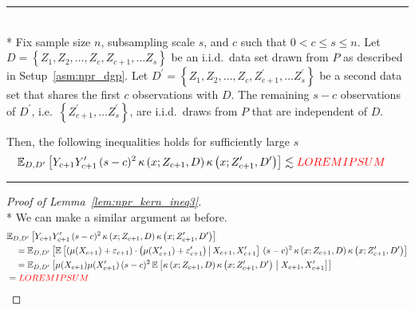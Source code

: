 \hrule

\begin{lem}\label{lem:npr_kern_ineq3}\mbox{}\\*
	Fix sample size $n$, subsampling scale $s$, and $c$ such that $0 < c \leq s \leq n$.
	Let $D = \left\{Z_1, Z_2, \dotsc, Z_c, Z_{c+1}, \dotsc Z_s \right\}$ be an i.i.d.\ data set drawn from $P$ as described in Setup~\ref{asm:npr_dgp}.
	Let $D^{\prime} = \left\{Z_1, Z_2, \dotsc, Z_c, Z_{c+1}^{\prime}, \dotsc Z_s^{\prime} \right\}$ be a second data set that shares the first $c$ observations with $D$.
	The remaining $s - c$ observations of $D^{\prime}$, i.e.\ $\left\{Z_{c+1}^{\prime}, \dotsc Z_s^{\prime} \right\}$, are i.i.d.\ draws from $P$ that are independent of $D$.

	Then, the following inequalities holds for sufficiently large $s$
	\begin{equation}
		\begin{aligned}
			\mathbb{E}_{D, D^{\prime}}\left[Y_{c+1}Y_{c+1}^{\prime} \, (s-c)^2 \, \kappa\left(x; Z_{c+1}, D\right)\kappa\left(x; Z_{c+1}^{\prime}, D^{\prime}\right)\right]
		 & \lesssim  {\color{red} LOREM IPSUM}	
		\end{aligned}
	\end{equation}
\end{lem}

\hrule

\begin{proof}[Proof of Lemma~\ref{lem:npr_kern_ineq3}]\mbox{}\\*
	We can make a similar argument as before.
	\begin{equation}
		\begin{aligned}
			& \mathbb{E}_{D, D^{\prime}}\left[Y_{c+1}Y_{c+1}^{\prime} \, (s-c)^2 \, \kappa\left(x; Z_{c+1}, D\right)\kappa\left(x; Z_{c+1}^{\prime}, D^{\prime}\right)\right]\\
			& \quad = \mathbb{E}_{D, D^{\prime}}\left[\mathbb{E}\left[\left(\mu(X_{c+1}) + \varepsilon_{c+1}\right) \cdot \left(\mu(X_{c+1}^{\prime}) + \varepsilon_{c+1}^{\prime}\right) \, \middle| \, X_{c+1}, X_{c+1}^{\prime}\right] \, (s-c)^2 \, \kappa\left(x; Z_{c+1}, D\right)\kappa\left(x; Z_{c+1}^{\prime}, D^{\prime}\right)\right] \\
			& \quad = \mathbb{E}_{D, D^{\prime}}\left[\mu(X_{c+1})\mu(X_{c+1}^{\prime}) \, (s-c)^2 \, 
			\mathbb{E}\left[\kappa\left(x; Z_{c+1}, D\right)\kappa\left(x; Z_{c+1}^{\prime}, D^{\prime}\right) \; \middle| \; X_{c+1}, X_{c+1}^{\prime}\right]\right] \\
			& = {\color{red} LOREM IPSUM}
		\end{aligned}
	\end{equation}
\end{proof}


